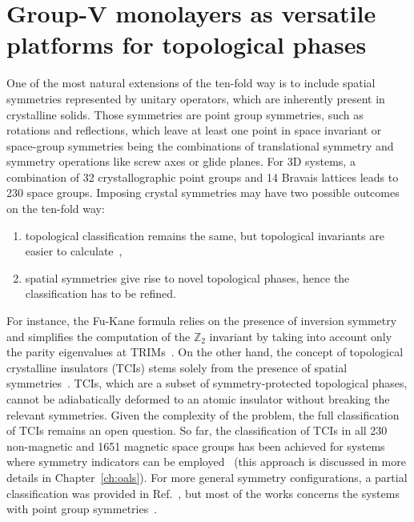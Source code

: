 \chapter{Group-V monolayers as versatile platforms for topological phases}
\label{ch:tci}
One of the most natural extensions of the ten-fold way is to include spatial symmetries represented by unitary operators, which are inherently present in crystalline solids. Those symmetries are point group symmetries, such as rotations and reflections, which leave at least one point in space invariant or space-group symmetries being the combinations of translational symmetry and symmetry operations like screw axes or glide planes. For 3D systems, a combination of 32 crystallographic point groups and 14 Bravais lattices leads to 230 space groups. Imposing crystal symmetries may have two possible outcomes on the ten-fold way: 
\begin{enumerate}[label=\textbf{\arabic*.}]
\item topological classification remains the same, but topological invariants are easier to calculate~\cite{PhysRevB.86.115112},
\item spatial symmetries give rise to novel topological phases, hence the classification has to be refined.
\end{enumerate}
For instance, the Fu-Kane formula relies on the presence of inversion symmetry and simplifies the computation of the $\mathbb{Z}_2$ invariant by taking into account only the parity eigenvalues at TRIMs~\cite{FuKane2007}. On the other hand, the concept of topological crystalline insulators (TCIs) stems solely from the presence of spatial symmetries~\cite{FuTCI2011}. TCIs, which are a subset of symmetry-protected topological phases, cannot be adiabatically deformed to an atomic insulator without breaking the relevant symmetries. Given the complexity of the problem, the full classification of TCIs remains an open question. So far, the classification of TCIs in all 230 non-magnetic and 1651 magnetic space groups has been achieved for systems where symmetry indicators can be employed~\cite{Po2017, Bradlyn17, watanabe2018structure, Tang2019} (this approach is discussed in more details in Chapter~\ref{ch:oals}). For more general symmetry configurations, a partial classification was provided in Ref.~\cite{Slager2013}, but most of the works concerns the systems with point group symmetries~\cite{RevModPhys.88.035005, PhysRevB.90.165114, PhysRevB.95.235425, PhysRevB.93.045429}.

